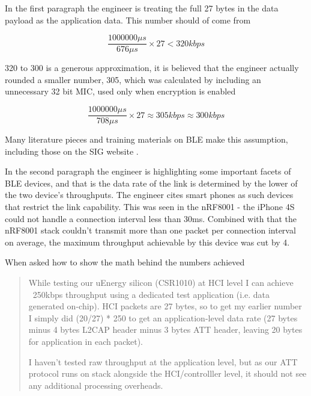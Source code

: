 \documentclass[]{article}
\begin{document}
 In the first paragraph the engineer is treating the full 27 bytes in the data payload as the application data. This number should of come from

\begin{displaymath}
\frac{1000000 \mu s}{676 \mu s} \times 27 < 320 kbps
\end{displaymath}

320 to 300 is a generous approximation, it is believed that the engineer actually rounded a smaller number, 305, which was calculated by including an unnecessary 32 bit \ac{MIC}, used only when encryption is enabled

\begin{displaymath}
\frac{1000000 \mu s}{708 \mu s} \times 27 \approx 305 kbps \approx 300 kbps
\end{displaymath}

Many literature pieces and training materials on \ac{BLE} make this assumption, including those on the \ac{SIG} website \cite{sig} \cite{sigdebug}. 

In the second paragraph the engineer is highlighting some important facets of \ac{BLE} devices, and that is the data rate of the link is determined by the lower of the two device's throughputs. The engineer cites smart phones as such devices that restrict the link capability. This was seen in the nRF8001 - the iPhone 4S could not handle a connection interval less than 30ms. Combined with that the nRF8001 stack couldn't transmit more than one packet per connection interval on average, the maximum throughput achievable by this device was cut by 4. 

When asked how to show the math behind the numbers achieved

\begin{quote}\itshape

While testing our uEnergy silicon (CSR1010) at HCI level I can achieve 
~250kbps throughput using a dedicated test application (i.e. data 
generated on-chip). HCI packets are 27 bytes, so to get my earlier 
number I simply did (20/27) * 250 to get an application-level data rate 
(27 bytes minus 4 bytes L2CAP header minus 3 bytes ATT header, leaving 
20 bytes for application in each packet).

I haven't tested raw throughput at the application level, but as our ATT 
protocol runs on stack alongside the HCI/controlller level, it should 
not see any additional processing overheads. \text{ \textnormal{[sic]}}

\end{quote}
\end{document}
